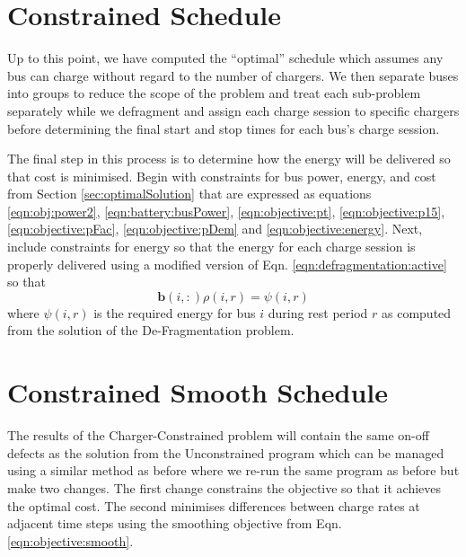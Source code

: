 \section{Constrained Schedule\label{sec:constrainedSchedule}}
Up to this point, we have computed the ``optimal'' schedule which assumes any bus can charge without regard to the number of chargers. We then separate buses into groups to reduce the scope of the problem and treat each sub-problem separately while we defragment and assign each charge session to specific chargers before determining the final start and stop times for each bus's charge session.
\par The final step in this process is to determine how the energy will be delivered so that cost is minimised. Begin with constraints for bus power, energy, and cost from Section \ref{sec:optimalSolution} that are expressed as equations \ref{eqn:obj:power2}, \ref{eqn:battery:busPower}, \ref{eqn:objective:pt}, \ref{eqn:objective:p15}, \ref{eqn:objective:pFac}, \ref{eqn:objective:pDem} and \ref{eqn:objective:energy}. Next, include constraints for energy so that the energy for each charge session is properly delivered using a modified version of Eqn. \ref{eqn:defragmentation:active} so that
\begin{equation}
	\mathbf{b}(i,:)\rho(i,r) = \psi(i,r)
\end{equation}
where $\psi(i,r)$ is the required energy for bus $i$ during rest period $r$ as computed from the solution of the De-Fragmentation problem.
\section{Constrained Smooth Schedule\label{sec:constrainedSmoothSchedule}}
 \par The results of the Charger-Constrained problem will contain the same on-off defects as the solution from the Unconstrained program which can be managed using a similar method as before where we re-run the same program as before but make two changes. The first change constrains the objective so that it achieves the optimal cost. The second minimises differences between charge rates at adjacent time steps using the smoothing objective from Eqn. \ref{eqn:objective:smooth}.
